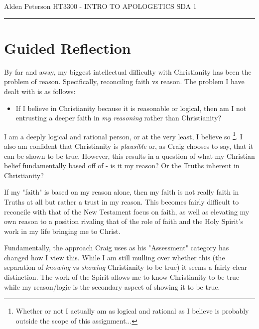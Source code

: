 \documentclass[12pt]{turabian-researchpaper}
\begin{document}
\begin{singlespace}
\noindent Alden Peterson \newline
\noindent HT3300 - INTRO TO APOLOGETICS \newline
\noindent SDA 1 \newline
\noindent\rule{4cm}{0.4pt}
\end{singlespace}

\section{Guided Reflection}


By far and away, my biggest intellectual difficulty with Christianity has been the problem of reason. Specifically, reconciling faith vs reason. The problem I have dealt with is as follows:

\begin{itemize}
  \item If I believe in Christianity because it is reasonable or logical, then am I not entrusting a deeper faith in \textit{my reasoning} rather than Christianity?
\end{itemize}

I am a deeply logical and rational person, or at the very least, I believe so \footnote{Whether or not I actually am as logical and rational as I believe is probably outside the scope of this assignment...}. I also am confident that Christianity is \textit{plausible} or, as Craig chooses to say, that it can be shown to be true. However, this results in a question of what my Christian belief fundamentally based off of - is it my reason? Or the Truths inherent in Christianity?

If my "faith" is based on my reason alone, then my faith is not really faith in Truths at all but rather a trust in my reason. This becomes fairly difficult to reconcile with that of the New Testament focus on faith, as well as elevating my own reason to a position rivaling that of the role of faith and the Holy Spirit's work in my life bringing me to Christ.

Fundamentally, the approach Craig uses as his "Assessment" \autocite[pg.8]{craig2008reasonable} category has changed how I view this. While I am still mulling over whether this (the separation of \textit{knowing} vs \textit{showing} Christianity to be true) it seems a fairly clear distinction. The work of the Spirit allows me to know Christianity to be true while my reason/logic is the secondary aspect of showing it to be true.
\end{document}
